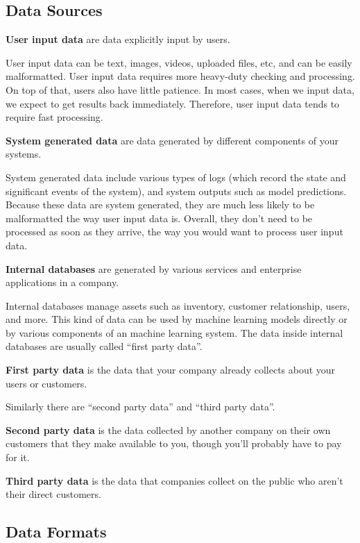 \subsection{Data Sources}

\textbf{User input data} are data explicitly input by users.
\ed

User input data can be text, images, videos, uploaded files, etc, and can be easily malformatted. User input data
requires more heavy-duty checking and processing. On top of that, users also have little patience. In most cases,
when we input data, we expect to get results back immediately. Therefore, user input data tends to require fast
processing.

\textbf{System generated data} are data generated by different components of your systems.
\ed

System generated data include various types of logs (which record the state and significant events of the system),
and system outputs such as model predictions. Because these data are system generated, they are much less likely to
be malformatted the way user input data is. Overall, they don't need to be processed as soon as they arrive, the way
you would want to process user input data.

\textbf{Internal databases} are generated by various services and enterprise applications in a company.
\ed

Internal databases manage assets such as inventory, customer relationship, users, and more. This kind of data can be
used by machine learning models directly or by various components of an machine learning system. The data inside
internal databases are usually called ``first party data''.

\textbf{First party data} is the data that your company already collects about your users or customers.
\ed

Similarly there are ``second party data'' and ``third party data''.

\textbf{Second party data} is the data collected by another company on their own customers that they make available
to you, though you'll probably have to pay for it.
\ed

\textbf{Third party data} is the data that companies collect on the public who aren't their direct customers.
\ed

\subsection{Data Formats}

